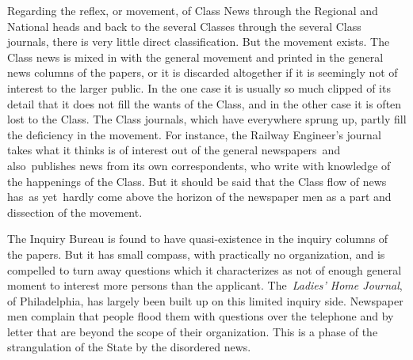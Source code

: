 \documentclass[twoside,symmetric,nobib,justified]{tufte-book}
\begin{document}
Regarding the reflex, or movement, of Class News through the Regional
and National heads and back to the several Classes through the several
Class journals, there is very little direct classification. But the
movement exists. The Class news is mixed in with the general movement
and printed in the general news columns of the papers, or it is
discarded altogether if it is seemingly not of interest to the larger
public. In the one case it is usually so much clipped of its detail that
it does not fill the wants of the Class, and in the other case it is
often lost to the Class. The Class journals, which have everywhere
sprung up, partly fill the deficiency in the movement. For instance, the
Railway Engineer's journal takes what it thinks is of interest out of
the general newspapers~and also~publishes news from its own
correspondents, who write with knowledge of the happenings of the Class.
But it should be said that the Class flow of news has~as yet~hardly come
above the horizon of the newspaper men as a part and dissection of the
movement.~

\newpage The Inquiry Bureau is found to have quasi-existence in the inquiry
columns of the papers. But it has small compass, with practically no
organization, and is compelled to turn away questions which it
characterizes as not of enough general moment to interest more persons
than the applicant. The~\emph{Ladies' Home Journal}, of Philadelphia,
has largely been built up on this limited inquiry side. Newspaper men
complain that people flood them with questions over the telephone and by
letter that are beyond the scope of their organization. This is a phase
of the strangulation of the State by the disordered news.~

\vspace{0.05in}
\end{document}
